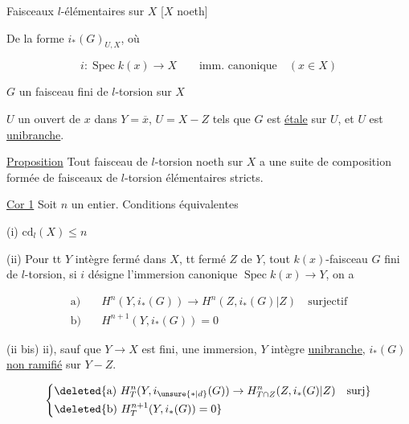 
Faisceaux $l$-élémentaires sur $X$ [$X$ noeth]

De la forme $i_*(G)_{U,X}$, où

\[
i:\operatorname{Spec} k(x)\longrightarrow X\qquad\text{imm. canonique}\quad(x\in X)
\]

$G$ un faisceau fini de $l$-torsion sur $X$

$U$ un  ouvert de $x$ dans $Y=\overline{x}$, $U=X-Z$  tels que $G$ est \uline{étale} sur $U$, et $U$ est \uline{unibranche}.

\uline{Proposition} Tout faisceau de $l$-torsion noeth sur $X$ a une suite de composition formée de faisceaux de $l$-torsion élémentaires stricts.

\uline{Cor 1} Soit $n$ un entier. Conditions équivalentes

(i) $\mathrm{cd}_l(X)\leq n$

(ii) Pour tt $Y$ intègre fermé dans $X$,   tt fermé $Z$ de $Y$,  tout $k(x)$-faisceau $G$ fini de $l$-torsion, si $i$ désigne l'immersion canonique $\operatorname{Spec} k(x)\longrightarrow Y$, on a

\[
\begin{aligned}
\text{a)}\quad&H^n(Y,i_*(G))\longrightarrow H^n(Z,i_*(G)|Z)\quad\text{surjectif}\\
\text{b)}\quad&H^{n+1}(Y,i_*(G))=0
\end{aligned}
\]

 (ii bis)  ii), sauf que $Y\longrightarrow X$ est fini,  une immersion, $Y$ intègre \uline{unibranche}, $i_*(G)$ \uline{non ramifié} sur $Y-Z$.


\[
\left\{\begin{aligned}
&\deleted{\text{a)}\ H^n_T(Y,i_{\unsure{*|d}}(G))\to H^n_{T\cap Z}(Z,i_*(G)|Z)\quad\text{surj}}\\
&\deleted{\text{b)}\ H^{n+1}_T(Y,i_*(G))=0}
\end{aligned}\right.
\]

